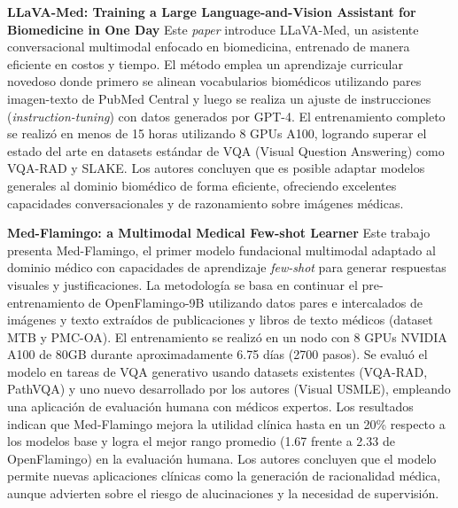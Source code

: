 \documentclass[11pt, a4paper]{article}
\begin{document}
\textbf{LLaVA-Med: Training a Large Language-and-Vision Assistant for Biomedicine in One Day} \cite{li_llava-med_nodate}
Este \textit{paper} introduce LLaVA-Med, un asistente conversacional multimodal enfocado en biomedicina, entrenado de manera eficiente en costos y tiempo. El método emplea un aprendizaje curricular novedoso
donde primero se alinean vocabularios biomédicos utilizando pares imagen-texto de PubMed Central y luego se realiza un ajuste de instrucciones (\textit{instruction-tuning}) con datos generados por GPT-4. El
entrenamiento completo se realizó en menos de 15 horas utilizando 8 GPUs A100, logrando superar el estado del arte en datasets estándar de VQA (Visual Question Answering) como VQA-RAD y SLAKE. Los autores
concluyen que es posible adaptar modelos generales al dominio biomédico de forma eficiente, ofreciendo excelentes capacidades conversacionales y de razonamiento sobre imágenes médicas.

\textbf{Med-Flamingo: a Multimodal Medical Few-shot Learner} \cite{moor_med-flamingo_nodate}
Este trabajo presenta Med-Flamingo, el primer modelo fundacional multimodal adaptado al dominio médico con capacidades de aprendizaje \textit{few-shot} para generar respuestas visuales y justificaciones.
La metodología se basa en continuar el pre-entrenamiento de OpenFlamingo-9B utilizando datos pares e intercalados de imágenes y texto extraídos de publicaciones y libros de texto médicos (dataset MTB y PMC-OA).
El entrenamiento se realizó en un nodo con 8 GPUs NVIDIA A100 de 80GB durante aproximadamente 6.75 días (2700 pasos). Se evaluó el modelo en tareas de VQA generativo usando datasets existentes (VQA-RAD, PathVQA)
y uno nuevo desarrollado por los autores (Visual USMLE), empleando una aplicación de evaluación humana con médicos expertos. Los resultados indican que Med-Flamingo mejora la utilidad clínica hasta en un 20\% 
respecto a los modelos base y logra el mejor rango promedio (1.67 frente a 2.33 de OpenFlamingo) en la evaluación humana. Los autores concluyen que el modelo permite nuevas aplicaciones clínicas como la generación
de racionalidad médica, aunque advierten sobre el riesgo de alucinaciones y la necesidad de supervisión.
\end{document}
